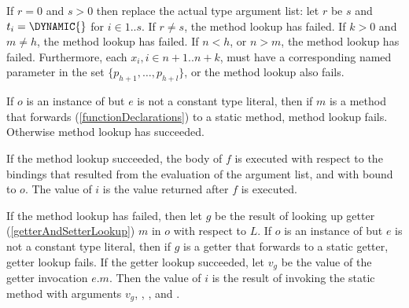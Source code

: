 \documentclass{article}
\begin{document}
%
%
%
\LMHash{}
If $r = 0$ and $s > 0$ then replace the actual type argument list:
let $r$ be $s$ and $t_i = \DYNAMIC{}$ for $i \in 1 .. s$.
If $r \not= s$, the method lookup has failed.
If $k > 0$ and $m \not= h$, the method lookup has failed.
If $n < h$, or $n > m$, the method lookup has failed.
Furthermore, each
$x_i, i \in n+1 .. n+k$, must have a corresponding named parameter in the set
$\{p_{h+1}, \ldots, p_{h+l}\}$,
or the method lookup also fails.

\LMHash{}
If $o$ is an instance of  but $e$ is not a constant type literal,
then if $m$ is a method that forwards (\ref{functionDeclarations}) to a static method,
method lookup fails.
Otherwise method lookup has succeeded.

\LMHash{}
If the method lookup succeeded,
the body of $f$ is executed with respect to the bindings that resulted from the evaluation of the argument list,
and with \THIS{} bound to $o$.
The value of $i$ is the value returned after $f$ is executed.

\LMHash{}
If the method lookup has failed,
then let $g$ be the result of looking up getter (\ref{getterAndSetterLookup}) $m$ in $o$ with respect to $L$.
If $o$ is an instance of  but $e$ is not a constant type literal,
then if $g$ is a getter that forwards to a static getter, getter lookup fails.
If the getter lookup succeeded,
let $v_g$ be the value of the getter invocation $e.m$.
Then the value of $i$ is the result of invoking the static method
with arguments
$v_g$,
\code{[$o_1, \ldots, o_n$]},
,
and
\code{[$t_1, \ldots, t_r$]}.
\end{document}
